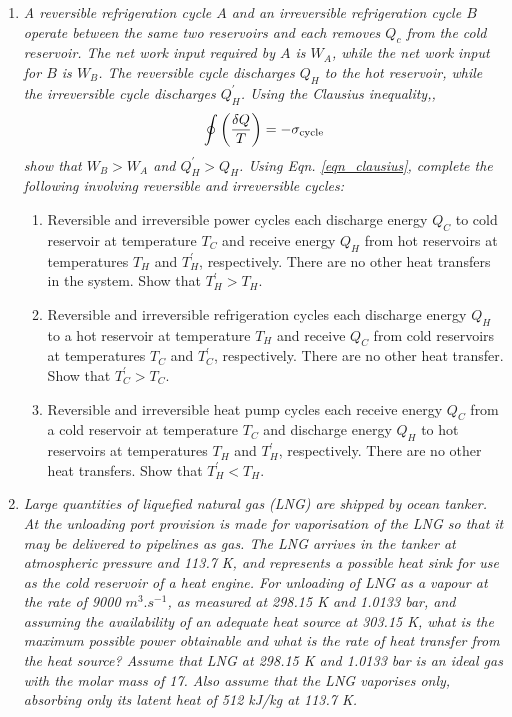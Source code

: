 \begin{enumerate}
\item {\it A reversible refrigeration cycle $A$ and an irreversible refrigeration cycle $B$ operate between the same two reservoirs and each removes $Q_{c}$ from the cold reservoir. The net work input required by $A$ is $W_{A}$, while the net work input for $B$ is $W_{B}$. The reversible cycle discharges $Q_{H}$ to the hot reservoir, while the irreversible cycle discharges $Q^{\prime}_{H}$.  Using the Clausius inequality,, 
\begin{equation}
\oint\left(\displaystyle\frac{\delta Q}{T}\right) = - \sigma_{\text{cycle}} \label{eqn_clausius}
\end{equation}
show that $W_{B} > W_{A}$ and $Q^{\prime}_{H}>Q_{H}$. Using Eqn. \ref{eqn_clausius}, complete the following involving reversible and irreversible cycles:
\begin{enumerate}
\item Reversible and irreversible power cycles each discharge energy $Q_{C}$ to cold reservoir at temperature $T_{C}$ and receive energy $Q_{H}$ from hot reservoirs at temperatures $T_{H}$ and $T^{\prime}_{H}$, respectively. There are no other heat transfers in the system. Show that $T^{\prime}_{H}>T_{H}$.
\item Reversible and irreversible refrigeration cycles each discharge energy $Q_{H}$ to a hot reservoir at temperature $T_{H}$ and receive $Q_{C}$ from cold reservoirs at temperatures $T_{C}$ and $T^{\prime}_{C}$, respectively. There are no other heat transfer. Show that $T^{\prime}_{C}>T_{C}$.
\item Reversible and irreversible heat pump cycles each receive energy $Q_{C}$ from a cold reservoir at temperature $T_{C}$ and discharge energy $Q_{H}$ to hot reservoirs at temperatures $T_{H}$ and $T^{\prime}_{H}$, respectively. There are no other heat transfers. Show that $T^{\prime}_{H}<T_{H}$. 
\end{enumerate}
}

\item {\it Large quantities of liquefied natural gas (LNG) are shipped by ocean tanker. At the unloading port provision is made for vaporisation of the LNG so that it may be delivered to pipelines as gas. The LNG arrives in the tanker at atmospheric pressure and 113.7 K, and represents a possible heat sink for use as the cold reservoir of a heat engine. For unloading of LNG as a vapour at the rate of 9000 $m^{3}.s^{-1}$, as measured at 298.15 K and 1.0133 bar, and assuming the availability of an adequate heat source at 303.15 K, what is the maximum possible power obtainable and what is the rate of heat transfer from the heat source? Assume that LNG at 298.15 K and 1.0133 bar is an ideal gas with the molar mass of 17. Also assume that the LNG vaporises only, absorbing only its latent heat of 512 kJ/kg at 113.7 K.}



\end{enumerate}

